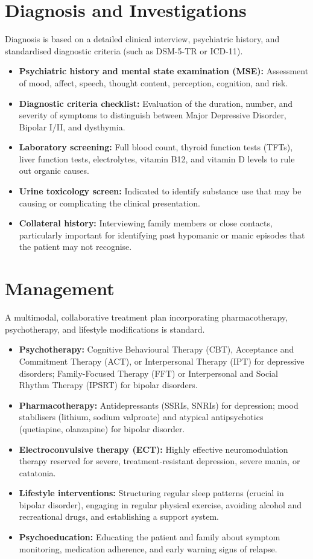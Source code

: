 \section*{Diagnosis and Investigations}
Diagnosis is based on a detailed clinical interview, psychiatric history, and standardised diagnostic criteria (such as DSM-5-TR or ICD-11).
\begin{itemize}
    \item \textbf{Psychiatric history and mental state examination (MSE):} Assessment of mood, affect, speech, thought content, perception, cognition, and risk.
    \item \textbf{Diagnostic criteria checklist:} Evaluation of the duration, number, and severity of symptoms to distinguish between Major Depressive Disorder, Bipolar I/II, and dysthymia.
    \item \textbf{Laboratory screening:} Full blood count, thyroid function tests (TFTs), liver function tests, electrolytes, vitamin B12, and vitamin D levels to rule out organic causes.
    \item \textbf{Urine toxicology screen:} Indicated to identify substance use that may be causing or complicating the clinical presentation.
    \item \textbf{Collateral history:} Interviewing family members or close contacts, particularly important for identifying past hypomanic or manic episodes that the patient may not recognise.
\end{itemize}

\section*{Management}
A multimodal, collaborative treatment plan incorporating pharmacotherapy, psychotherapy, and lifestyle modifications is standard.
\begin{itemize}
    \item \textbf{Psychotherapy:} Cognitive Behavioural Therapy (CBT), Acceptance and Commitment Therapy (ACT), or Interpersonal Therapy (IPT) for depressive disorders; Family-Focused Therapy (FFT) or Interpersonal and Social Rhythm Therapy (IPSRT) for bipolar disorders.
    \item \textbf{Pharmacotherapy:} Antidepressants (SSRIs, SNRIs) for depression; mood stabilisers (lithium, sodium valproate) and atypical antipsychotics (quetiapine, olanzapine) for bipolar disorder.
    \item \textbf{Electroconvulsive therapy (ECT):} Highly effective neuromodulation therapy reserved for severe, treatment-resistant depression, severe mania, or catatonia.
    \item \textbf{Lifestyle interventions:} Structuring regular sleep patterns (crucial in bipolar disorder), engaging in regular physical exercise, avoiding alcohol and recreational drugs, and establishing a support system.
    \item \textbf{Psychoeducation:} Educating the patient and family about symptom monitoring, medication adherence, and early warning signs of relapse.
\end{itemize}

